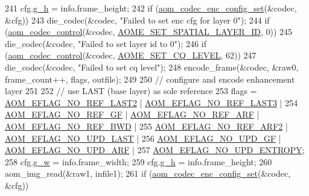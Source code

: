 \begin{DoxyCodeInclude}
{{{{{{{241     cfg.\hyperlink{structaom__codec__enc__cfg_a37b0f57b63bec8d133df8901d4407ee6}{g\_h} = info.frame\_height;
242     \textcolor{keywordflow}{if} (\hyperlink{group__encoder_gaf4a4c3c3c91dd92c960990f6e534271d}{aom\_codec\_enc\_config\_set}(&codec, &cfg))
243       die\_codec(&codec, \textcolor{stringliteral}{"Failed to set enc cfg for layer 0"});
244     \textcolor{keywordflow}{if} (\hyperlink{group__codec_ga6da974f4eeaba1fa74106b28d0fe6ac5}{aom\_codec\_control}(&codec, \hyperlink{group__aom__encoder_ggae78dde67a6d78f332e9bdba0dde42db5aac7fbd0de7295387d7821f1889c47790}{AOME\_SET\_SPATIAL\_LAYER\_ID}, 0))
245       die\_codec(&codec, \textcolor{stringliteral}{"Failed to set layer id to 0"});
246     \textcolor{keywordflow}{if} (\hyperlink{group__codec_ga6da974f4eeaba1fa74106b28d0fe6ac5}{aom\_codec\_control}(&codec, \hyperlink{group__aom__encoder_ggae78dde67a6d78f332e9bdba0dde42db5af67f265bf63bf8f1268b3a14ae26606c}{AOME\_SET\_CQ\_LEVEL}, 62))
247       die\_codec(&codec, \textcolor{stringliteral}{"Failed to set cq level"});
248     encode\_frame(&codec, &raw0, frame\_count++, flags, outfile);
249 
250     \textcolor{comment}{// configure and encode enhancement layer}
251 
252     \textcolor{comment}{//  use LAST (base layer) as sole reference}
253     flags = \hyperlink{group__aom__encoder_ga50c2560ca6670298cfc614ecae96a391}{AOM\_EFLAG\_NO\_REF\_LAST2} | 
      \hyperlink{group__aom__encoder_gaa4bc8ae2b977b73f0ef57ba428ca1d2c}{AOM\_EFLAG\_NO\_REF\_LAST3} |
254             \hyperlink{group__aom__encoder_gaaef6fe76991abf87edd2f296eee999f8}{AOM\_EFLAG\_NO\_REF\_GF} | \hyperlink{group__aom__encoder_ga9e2f989737d63ddf4e987a525d186a46}{AOM\_EFLAG\_NO\_REF\_ARF} | 
      \hyperlink{group__aom__encoder_ga758649aa6cd9fefb15ad888489884a38}{AOM\_EFLAG\_NO\_REF\_BWD} |
255             \hyperlink{group__aom__encoder_gad04799a74215e1b9609f7ccd1766f8c9}{AOM\_EFLAG\_NO\_REF\_ARF2} | \hyperlink{group__aom__encoder_ga7a55a46970c074b761319c5c46d87b6e}{AOM\_EFLAG\_NO\_UPD\_LAST} |
256             \hyperlink{group__aom__encoder_gaa81cc31f95fd463f51a158050d267a36}{AOM\_EFLAG\_NO\_UPD\_GF} | \hyperlink{group__aom__encoder_ga469b4cf5ff76cb30de951e129c25a786}{AOM\_EFLAG\_NO\_UPD\_ARF} |
257             \hyperlink{group__aom__encoder_gac5a69f04b0bc88f755587a1da815d754}{AOM\_EFLAG\_NO\_UPD\_ENTROPY};
258     cfg.\hyperlink{structaom__codec__enc__cfg_a80cb459c5ef3c7e1516f617c4c9d6eab}{g\_w} = info.frame\_width;
259     cfg.\hyperlink{structaom__codec__enc__cfg_a37b0f57b63bec8d133df8901d4407ee6}{g\_h} = info.frame\_height;
260     aom\_img\_read(&raw1, infile1);
261     \textcolor{keywordflow}{if} (\hyperlink{group__encoder_gaf4a4c3c3c91dd92c960990f6e534271d}{aom\_codec\_enc\_config\_set}(&codec, &cfg))
}}}}}}}
\end{DoxyCodeInclude}
